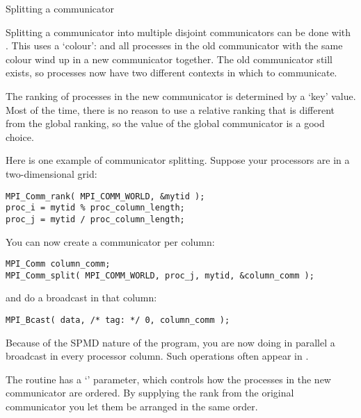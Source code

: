 
 {Splitting a communicator}
\label{sec:comm-split}

Splitting a communicator into multiple disjoint communicators
can be done with .
This uses a `colour':
%
%
and all processes in the old communicator with the same colour
wind up in a new communicator together. The old communicator still exists,
so processes now have two different contexts in which to communicate.

The ranking of processes in the new communicator is determined by a `key' value.
Most of the time, there is no reason to use a relative ranking that is different from
the global ranking, so the  value of the global communicator
is a good choice.

Here is one example of communicator splitting. Suppose your processors
are in a two-dimensional grid:
\begin{lstlisting}
MPI_Comm_rank( MPI_COMM_WORLD, &mytid );
proc_i = mytid % proc_column_length;
proc_j = mytid / proc_column_length;
\end{lstlisting}
You can now create a communicator per column:
\begin{lstlisting}
MPI_Comm column_comm;
MPI_Comm_split( MPI_COMM_WORLD, proc_j, mytid, &column_comm );
\end{lstlisting}
and do a broadcast in that column:
\begin{lstlisting}
MPI_Bcast( data, /* tag: */ 0, column_comm );
\end{lstlisting}
Because of the SPMD nature of the program, you are now doing in parallel
a broadcast in every processor column. Such operations often appear
in .

The  routine has a `' parameter,
which controls how the processes in the new communicator are
ordered. By supplying the rank from the original communicator you let
them be arranged in the same order.


